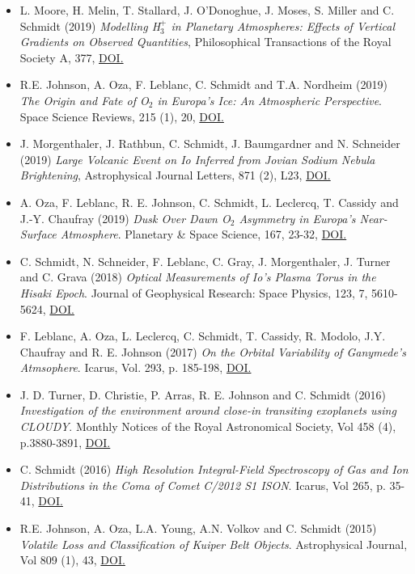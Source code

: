 \documentclass[12pt]{report}
\begin{document}
\begin{itemize}
  \item L. Moore, H. Melin, T. Stallard, J. O'Donoghue, J. Moses, S. Miller and C. Schmidt (2019) \textit{Modelling H$_3^+$ in Planetary Atmospheres: Effects of Vertical Gradients on Observed Quantities}, Philosophical Transactions of the Royal Society A, 377, \href{https://doi.org/10.1098/rsta.2019.0067}{DOI.}
  \item R.E. Johnson, A. Oza, F. Leblanc,  C. Schmidt and T.A. Nordheim (2019) \textit{The Origin and Fate of O$_2$ in Europa's Ice: An Atmospheric Perspective}. Space Science Reviews, 215 (1), 20, \href{https://doi.org/10.1007/s11214-019-0582-1}{DOI.}
  \item J. Morgenthaler, J. Rathbun, C. Schmidt, J. Baumgardner and N. Schneider (2019) \textit{Large Volcanic Event on Io Inferred from Jovian Sodium Nebula Brightening}, Astrophysical Journal Letters, 871 (2), L23, \href{https://doi.org/10.3847/2041-8213/aafdb7}{DOI.}
  \item A. Oza, F. Leblanc, R. E. Johnson, C. Schmidt, L. Leclercq, T. Cassidy and J.-Y. Chaufray (2019) \textit{Dusk Over Dawn O$_2$ Asymmetry in Europa's Near-Surface Atmosphere}. Planetary \& Space Science, 167, 23-32, \href{https://doi.org/10.1016/j.pss.2019.01.006}{DOI.}
  \item C. Schmidt, N. Schneider, F. Leblanc, C. Gray, J. Morgenthaler, J. Turner and C. Grava (2018) \textit{Optical Measurements of Io's Plasma Torus in the Hisaki Epoch}. Journal of Geophysical Research: Space Physics, 123, 7, 5610-5624, \href{https://doi.org/10.1029/2018JA025296}{DOI.}
  \item F. Leblanc, A. Oza, L. Leclercq, C. Schmidt, T. Cassidy, R. Modolo, J.Y. Chaufray and R. E. Johnson (2017) \textit{On the Orbital Variability of Ganymede's Atmsophere}. Icarus, Vol. 293, p. 185-198, \href{doi.org/10.1016/j.icarus.2017.04.025}{DOI.}
  \item J. D. Turner, D. Christie, P. Arras, R. E. Johnson and C. Schmidt (2016) \textit{Investigation of the environment around close-in transiting exoplanets using CLOUDY}. Monthly Notices of the Royal Astronomical Society, Vol 458 (4), p.3880-3891, \href{https://doi.org/10.1093/mnras/stw556}{DOI.}
  \item C. Schmidt (2016) \textit{High Resolution Integral-Field Spectroscopy of Gas and Ion Distributions in the Coma of Comet C/2012 S1 ISON}. Icarus, Vol 265, p. 35-41, \href{https://doi.org/10.1016/j.icarus.2015.10.009}{DOI.}
  \item R.E. Johnson, A. Oza, L.A. Young, A.N. Volkov and C. Schmidt (2015) \textit{Volatile Loss and Classification of Kuiper Belt Objects}. Astrophysical Journal, Vol 809 (1), 43, \href{https://doi.org/10.1088/0004-637X/809/1/43}{DOI.}

\end{itemize}
\end{document}
